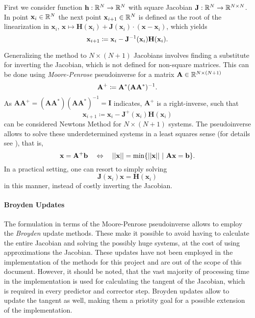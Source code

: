 First we consider function $\mathbf h: \mathbb{R}^N \to \mathbb{R}^N$ with square Jacobian $\mathbf J: \mathbb{R}^N \to \mathbb{R}^{N \times N}$.
In point $\mathbf x_i \in \mathbb{R}^N$ the next point $\mathbf x_{i+1} \in \mathbb{R}^N$ is defined as the root of the linearization in $\mathbf x_i$, $\mathbf x \mapsto \mathbf H(\mathbf x_i) + \mathbf J(\mathbf x_i) \cdot (\mathbf x - \mathbf x_i)$, which yields
	\[
		\mathbf x_{i+1} \coloneqq \mathbf x_i - \mathbf J^{-1}(\mathbf x_i) \mathbf H(\mathbf x_i) \text.
	\]

Generalizing the method to $N \times (N+1)$ Jacobians involves finding a substitute for inverting the Jacobian, which is not defined for non-square matrices.
This can be done using \emph{Moore-Penrose} pseudoinverse for a matrix $\mathbf A \in \mathbb{R}^{N \times (N+1)}$
	\[
		\mathbf A^+ \coloneqq \mathbf A^*(\mathbf A \mathbf A^*)^{-1} \text.
	\]
As $\mathbf A \mathbf A^+ = (\mathbf A \mathbf A^*)(\mathbf A \mathbf A^*)^{-1} = \mathbf I$ indicates, $\mathbf A^+$ is a right-inverse, such that
	\[
		\mathbf x_{i+1} \coloneqq \mathbf x_i - \mathbf J^+(\mathbf x_i) \mathbf H(\mathbf x_i)
	\]
can be considered Newtons Method for $N\times (N+1)$ systems.
The pseudoinverse allows to solve these underdetermined systems in a least squares sense (for details see \cite{allgower1990numerical}), that is,
	\[
		\mathbf x = \mathbf A^+ \mathbf b \quad \Leftrightarrow \quad \mathbf ||\mathbf x|| = \min \{ ||\mathbf x||\ |\ \mathbf A \mathbf x = \mathbf b\} \text.
	\]
In a practical setting, one can resort to simply solving
	\[
		\mathbf J(\mathbf x_i) \mathbf x = \mathbf H(\mathbf x_i)
	\]
in this manner, instead of costly inverting the Jacobian.

\paragraph{Broyden Updates} The formulation in terms of the Moore-Penrose pseudoinverse allows to employ the \emph{Broyden} update methods.
These make it possible to avoid having to calculate the entire Jacobian and solving the possibly huge systems, at the cost of using approximations the Jacobian.
These updates have not been employed in the implementation of the methods for this project and are out of the scope of this document.
However, it should be noted, that the vast majority of processing time in the implementation is used for calculating the tangent of the Jacobian, which is required in every predictor and corrector step.
Broyden updates allow to update the tangent as well, making them a priotity goal for a possible extension of the implementation.



